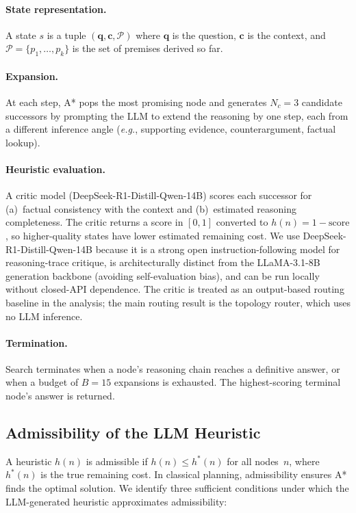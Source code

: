 \documentclass{article}
\newcommand{\eg}{\emph{e.g.},\xspace}
\begin{document}
\paragraph{State representation.}
A state $s$ is a tuple $(\mathbf{q}, \mathbf{c}, \mathcal{P})$ where
$\mathbf{q}$ is the question, $\mathbf{c}$ is the context, and
$\mathcal{P} = \{p_1, \ldots, p_k\}$ is the set of premises derived so far.

\paragraph{Expansion.}
At each step, A* pops the most promising node and generates $N_c = 3$
candidate successors by prompting the LLM to extend the reasoning by one
step, each from a different inference angle (\eg supporting evidence,
counterargument, factual lookup).

\paragraph{Heuristic evaluation.}
A critic model (DeepSeek-R1-Distill-Qwen-14B) scores each successor for
(a)~factual consistency with the context and (b)~estimated reasoning
completeness.  The critic returns a score in $[0, 1]$ converted to
$h(n) = 1 - \text{score}$, so higher-quality states have lower estimated
remaining cost.  We use DeepSeek-R1-Distill-Qwen-14B because it is a strong
open instruction-following model for reasoning-trace critique, is
architecturally distinct from the LLaMA-3.1-8B generation backbone (avoiding
self-evaluation bias), and can be run locally without closed-API dependence.
The critic is treated as an output-based routing baseline in the analysis; the
main routing result is the topology router, which uses no LLM inference.

\paragraph{Termination.}
Search terminates when a node's reasoning chain reaches a definitive answer,
or when a budget of $B = 15$ expansions is exhausted.  The
highest-scoring terminal node's answer is returned.

\subsection{Admissibility of the LLM Heuristic}
\label{sec:admissibility}

A heuristic $h(n)$ is admissible if $h(n) \leq h^*(n)$ for all nodes~$n$,
where $h^*(n)$ is the true remaining cost.  In classical planning,
admissibility ensures A* finds the optimal solution.  We identify three
sufficient conditions under which the LLM-generated heuristic approximates
admissibility:
\end{document}
